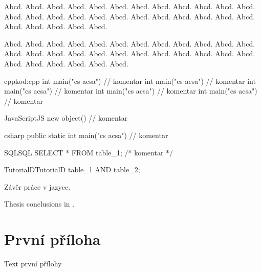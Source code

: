 \documentclass[
  biblatex,
  figures=false,
  glossaries,
  index
]{kidiplom}
\begin{document}
\begin{consequence}
Abcd. Abcd. Abcd. Abcd. Abcd. Abcd. Abcd. Abcd. Abcd. Abcd. Abcd. Abcd. Abcd. Abcd. Abcd. Abcd. Abcd. Abcd. Abcd. Abcd. Abcd. Abcd. Abcd. Abcd. Abcd. Abcd. Abcd. Abcd. Abcd.
\end{consequence}

\begin{theorem}
Abcd. Abcd. Abcd. Abcd. Abcd. Abcd. Abcd. Abcd. Abcd. Abcd. Abcd. Abcd. Abcd. Abcd. Abcd. Abcd. Abcd. Abcd. Abcd. Abcd. Abcd. Abcd. Abcd. Abcd. Abcd. Abcd. Abcd. Abcd. Abcd. Abcd.
\end{theorem}


\begin{kicode}{cpp}{kod:cpp}{\cpp}
int main("cs acsa") // komentar
int main("cs acsa") // komentar
int main("cs acsa") // komentar
int main("cs acsa") // komentar
int main("cs acsa") // komentar
\end{kicode}

\begin{kicode}{JavaScript}{}{JS}
new object() // komentar
\end{kicode}

\begin{kicode}{csharp}{}{\csharp}
public static int main("cs acsa") // komentar
\end{kicode}

\begin{kicode}{SQL}{}{SQL}
SELECT * FROM table_1; /* komentar */
\end{kicode}

\begin{kicode}{TutorialD}{}{TutorialD}
table_1 AND table_2;
\end{kicode}

\begin{kiconclusions}
Závěr práce v  jazyce.
\end{kiconclusions}

\begin{kiconclusions}[english]
Thesis conclusions in .
\end{kiconclusions}

\appendix

\section{První příloha}
Text první přílohy
\end{document}
